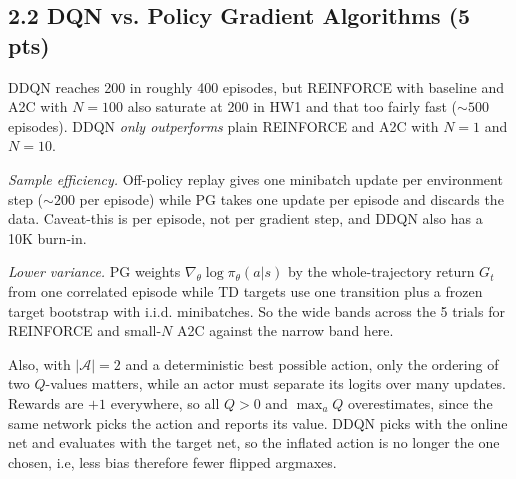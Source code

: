 \documentclass[12pt]{article}
\begin{document}
\subsection*{2.2 DQN vs. Policy Gradient Algorithms (5 pts)}
\begin{solution}[height=8cm]
DDQN reaches 200 in roughly 400 episodes, but REINFORCE with baseline and A2C with $N=100$ also saturate at 200 in HW1 and that too fairly fast ($\sim500$ episodes). DDQN \emph{only outperforms} plain REINFORCE and A2C with $N=1$ and $N=10$.

\emph{Sample efficiency.} Off-policy replay gives one minibatch update per environment step ($\sim200$ per episode) while PG takes one update per episode and discards the data. Caveat-this is per episode, not per gradient step, and DDQN also has a 10K burn-in.

\emph{Lower variance.} PG weights $\nabla_\theta\log\pi_\theta(a|s)$ by the whole-trajectory return $G_t$ from one correlated episode while TD targets use one transition plus a frozen target bootstrap with i.i.d. minibatches. So the wide bands across the 5 trials for REINFORCE and small-$N$ A2C against the narrow band here.

\small Also, with $|\mathcal{A}|=2$ and a deterministic best possible action, only the ordering of two $Q$-values matters, while an actor must separate its logits over many updates. Rewards are $+1$ everywhere, so all $Q>0$ and $\max_a Q$ overestimates, since the same network picks the action and reports its value. DDQN picks with the online net and evaluates with the target net, so the inflated action is no longer the one chosen, i.e, less bias therefore fewer flipped argmaxes.
\end{solution}
\end{document}
